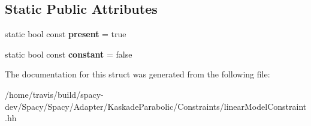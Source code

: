 \subsection*{Static Public Attributes}
\begin{DoxyCompactItemize}
\item 
\hypertarget{structKaskade_1_1LinearModelPDE_1_1D1_a6500448cc969217646e142550c1e8d2f}{static bool const {\bfseries present} = true}\label{structKaskade_1_1LinearModelPDE_1_1D1_a6500448cc969217646e142550c1e8d2f}

\item 
\hypertarget{structKaskade_1_1LinearModelPDE_1_1D1_aac18b1d0e2bcd6d9259adc23a1616321}{static bool const {\bfseries constant} = false}\label{structKaskade_1_1LinearModelPDE_1_1D1_aac18b1d0e2bcd6d9259adc23a1616321}

\end{DoxyCompactItemize}


The documentation for this struct was generated from the following file\-:\begin{DoxyCompactItemize}
\item 
/home/travis/build/spacy-\/dev/\-Spacy/\-Spacy/\-Adapter/\-Kaskade\-Parabolic/\-Constraints/linear\-Model\-Constraint.\-hh\end{DoxyCompactItemize}
